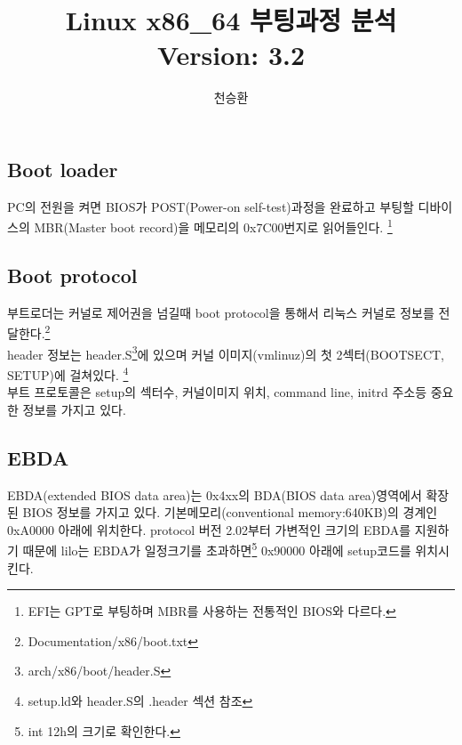 \documentclass[a4paper,11pt]{report}
\begin{document}
\begin{CJK}{UTF8}{}

\title{Linux x86\_64 부팅과정 분석\\
Version: 3.2\\}
\author{
\and{ 천승환}
}
\date{}


\maketitle

\chapter{Boot loader}
PC의 전원을 켜면 BIOS가 POST(Power-on self-test)과정을 완료하고 부팅할 디바이스의 MBR(Master boot record)을 메모리의 0x7C00번지로 읽어들인다.
\footnote{EFI는 GPT로 부팅하며 MBR를 사용하는 전통적인 BIOS와 다르다.}

\section{Boot protocol}
부트로더는 커널로 제어권을 넘길때 boot protocol을 통해서 리눅스 커널로 정보를 전달한다.\footnote{Documentation/x86/boot.txt}\\
header 정보는 header.S\footnote{arch/x86/boot/header.S}에 있으며 커널 이미지(vmlinuz)의 첫 2섹터(BOOTSECT, SETUP)에 걸쳐있다. \footnote{setup.ld와 header.S의 .header 섹션 참조}\\
부트 프로토콜은 setup의 섹터수, 커널이미지 위치, command line, initrd 주소등 중요한 정보를 가지고 있다.

\section{EBDA}
EBDA(extended BIOS data area)는 0x4xx의 BDA(BIOS data area)영역에서 확장된 BIOS 정보를 가지고 있다. 기본메모리(conventional memory:640KB)의 경계인 0xA0000 아래에 위치한다.
protocol 버전 2.02부터 가변적인 크기의 EBDA를 지원하기 때문에 lilo는 EBDA가 일정크기를 초과하면\footnote{int 12h의 크기로 확인한다.} 0x90000 아래에 setup코드를 위치시킨다.


\end{CJK}
\end{document}
